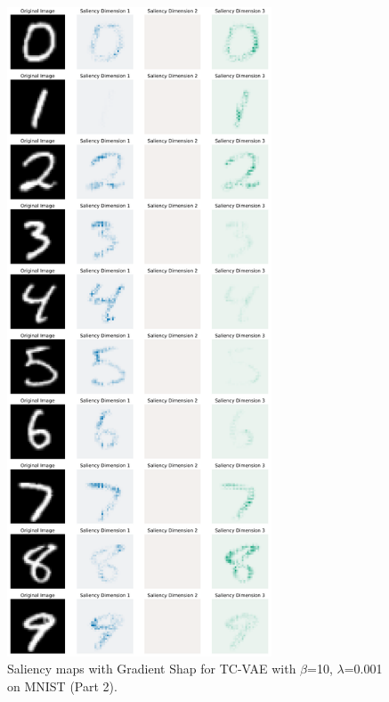 \begin{figure}[h]
\centering
    \includegraphics[width=0.7\textwidth]{images/vae/tc_vae_10_sms_mnist_lambda_0_001_2.PNG}
\caption{Saliency maps with Gradient Shap for TC-VAE with  $\beta$=10, $\lambda$=0.001 on MNIST (Part 2).}\label{fig:tc_vae_10_sms_mnist_lambda_0_001_2}
\end{figure}

